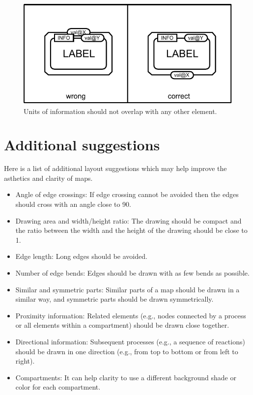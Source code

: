 \begin{figure}[htb]
  \centering
  \includegraphics[scale=0.8]{images/layout-unit-information}
  \caption{Units of information should not overlap with any
  other element.}\label{fig:layout7}
\end{figure}

\section{Additional suggestions}

Here is a list of additional layout suggestions which may help improve the asthetics and clarity of \PD maps.

\begin{itemize}
  \item Angle of edge crossings: If edge crossing cannot be avoided then the edges should cross with an angle close to 90\degree.
 \item Drawing area and width/height ratio: The drawing should
  be compact and the ratio between the width and the height
  of the drawing should be close to 1.
  \item Edge length: Long edges should be avoided.
  \item Number of edge bends: Edges should be drawn with
  as few bends as possible.
  \item Similar and symmetric parts: Similar parts of a map
  should be drawn in a similar way, and symmetric parts
  should be drawn symmetrically.
  \item Proximity information: Related elements (e.g., nodes
  connected by a process or all elements within a compartment)
  should be drawn close together.
  \item Directional information: Subsequent processes (e.g., a sequence
  of reactions) should be drawn in one direction (e.g., from
  top to bottom or from left to right).
  \item Compartments: It can help clarity to use a different background shade or color for each compartment.
\end{itemize}
